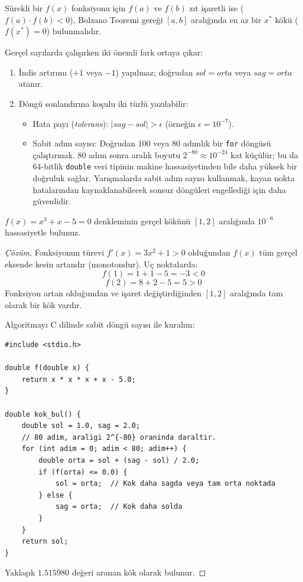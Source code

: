 Sürekli bir $f(x)$ fonksiyonu için $f(a)$ ve $f(b)$ zıt işaretli ise ($f(a) \cdot f(b) < 0$), Bolzano Teoremi gereği $[a, b]$ aralığında en az bir $x^*$ kökü ($f(x^*) = 0$) bulunmalıdır.

Gerçel sayılarda çalışırken iki önemli fark ortaya çıkar:
\begin{enumerate}
    \item İndis artırımı ($+1$ veya $-1$) yapılmaz; doğrudan $sol = orta$ veya $sag = orta$ atanır.
    \item Döngü sonlandırma koşulu iki türlü yazılabilir:
    \begin{itemize}
        \item Hata payı (\emph{tolerans}): $|sag - sol| > \epsilon$ (örneğin $\epsilon = 10^{-7}$).
        \item Sabit adım sayısı: Doğrudan $100$ veya $80$ adımlık bir \texttt{for} döngüsü çalıştırmak. $80$ adım sonra aralık boyutu $2^{-80} \approx 10^{-24}$ kat küçülür; bu da $64$-bitlik \texttt{double} veri tipinin makine hassasiyetinden bile daha yüksek bir doğruluk sağlar. Yarışmalarda sabit adım sayısı kullanmak, kayan nokta hatalarından kaynaklanabilecek sonsuz döngüleri engellediği için daha güvenlidir.
    \end{itemize}
\end{enumerate}

\begin{example}
$f(x) = x^3 + x - 5 = 0$ denkleminin gerçel kökünü $[1, 2]$ aralığında $10^{-6}$ hassasiyetle bulunuz.
\end{example}

\begin{proof}[Çözüm]
Fonksiyonun türevi $f'(x) = 3x^2 + 1 > 0$ olduğundan $f(x)$ tüm gerçel eksende kesin artandır (monotondur).
Uç noktalarda:
\[ f(1) = 1 + 1 - 5 = -3 < 0 \]
\[ f(2) = 8 + 2 - 5 = 5 > 0 \]
Fonksiyon artan olduğundan ve işaret değiştirdiğinden $[1, 2]$ aralığında tam olarak bir kök vardır.

Algoritmayı C dilinde sabit döngü sayısı ile kuralım:
\begin{lstlisting}[language=CTemel]
#include <stdio.h>

double f(double x) {
    return x * x * x + x - 5.0;
}

double kok_bul() {
    double sol = 1.0, sag = 2.0;
    // 80 adim, araligi 2^{-80} oraninda daraltir.
    for (int adim = 0; adim < 80; adim++) {
        double orta = sol + (sag - sol) / 2.0;
        if (f(orta) <= 0.0) {
            sol = orta;  // Kok daha sagda veya tam orta noktada
        } else {
            sag = orta;  // Kok daha solda
        }
    }
    return sol;
}
\end{lstlisting}
Yaklaşık $1.515980$ değeri aranan kök olarak bulunur.
\end{proof}

